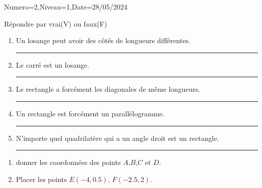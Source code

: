 \documentclass[a4paper,12pt]{article}
\newcommand{\tr}[1][1cm]{
\textcolor{gray}{\rule[-1pt]{#1}{0.5pt}}%
}
\begin{document}
\begin{Maquette}[DevS]{Numero=2,Niveau=1,Date=28/05/2024}

\begin{exercice}
Répondre par vrai(V) ou faux(F)
\begin{enumerate}
\item{} Un losange peut avoir des côtés de longueurs différentes.\tr[2cm]
\item{} Le carré est un losange.\tr[2cm]
\item{} Le rectangle a forcément les diagonales de même longueurs.\tr[2cm]
\item{} Un rectangle est forcément un parallélogramme.\tr[2cm]
\item{} N'importe quel quadrilatère qui a un angle droit est un rectangle.\tr[2cm]
\end{enumerate}
\end{exercice}


\begin{exercice}
\begin{minipage}[c]{0.4\linewidth}
\begin{enumerate}
\item{} donner les coordonnées des points $A$,$B$,$C$ et $D$.\newline
\lines[6]
\item{} Placer les points $E(-4, 0.5)$, $F(-2.5, 2)$.
\end{enumerate}
\end{minipage}%
\begin{minipage}[c]{0.6\linewidth}
\begin{AffRepere}
\end{AffRepere}
\end{minipage}
\end{exercice}


\end{Maquette}
\end{document}
